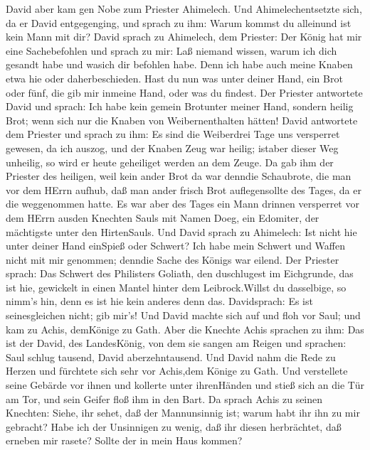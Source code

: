  David aber kam gen Nobe zum Priester Ahimelech. Und
Ahimelechentsetzte sich, da er David entgegenging, und sprach zu ihm:
Warum kommst du alleinund ist kein Mann mit dir?  David
sprach zu Ahimelech, dem Priester: Der König hat mir eine Sachebefohlen
und sprach zu mir: Laß niemand wissen, warum ich dich gesandt habe und
wasich dir befohlen habe. Denn ich habe auch meine Knaben etwa hie oder
daherbeschieden.  Hast du nun was unter deiner Hand, ein
Brot oder fünf, die gib mir inmeine Hand, oder was du findest.
 Der Priester antwortete David und sprach: Ich habe kein
gemein Brotunter meiner Hand, sondern heilig Brot; wenn sich nur die
Knaben von Weibernenthalten hätten!  David antwortete dem
Priester und sprach zu ihm: Es sind die Weiberdrei Tage uns versperret
gewesen, da ich auszog, und der Knaben Zeug war heilig; istaber dieser
Weg unheilig, so wird er heute geheiliget werden an dem Zeuge.
 Da gab ihm der Priester des heiligen, weil kein ander Brot
da war denndie Schaubrote, die man vor dem HErrn aufhub, daß man ander
frisch Brot auflegensollte des Tages, da er die weggenommen hatte.
 Es war aber des Tages ein Mann drinnen versperret vor dem
HErrn ausden Knechten Sauls mit Namen Doeg, ein Edomiter, der mächtigste
unter den HirtenSauls.  Und David sprach zu Ahimelech: Ist
nicht hie unter deiner Hand einSpieß oder Schwert? Ich habe mein Schwert
und Waffen nicht mit mir genommen; denndie Sache des Königs war eilend.
 Der Priester sprach: Das Schwert des Philisters Goliath,
den duschlugest im Eichgrunde, das ist hie, gewickelt in einen Mantel
hinter dem Leibrock.Willst du dasselbige, so nimm's hin, denn es ist hie
kein anderes denn das. Davidsprach: Es ist seinesgleichen nicht; gib
mir's!  Und David machte sich auf und floh vor Saul; und
kam zu Achis, demKönige zu Gath.  Aber die Knechte Achis
sprachen zu ihm: Das ist der David, des LandesKönig, von dem sie sangen
am Reigen und sprachen: Saul schlug tausend, David aberzehntausend.
 Und David nahm die Rede zu Herzen und fürchtete sich sehr
vor Achis,dem Könige zu Gath.  Und verstellete seine
Gebärde vor ihnen und kollerte unter ihrenHänden und stieß sich an die
Tür am Tor, und sein Geifer floß ihm in den Bart.  Da
sprach Achis zu seinen Knechten: Siehe, ihr sehet, daß der Mannunsinnig
ist; warum habt ihr ihn zu mir gebracht?  Habe ich der
Unsinnigen zu wenig, daß ihr diesen herbrächtet, daß erneben mir rasete?
Sollte der in mein Haus kommen?

